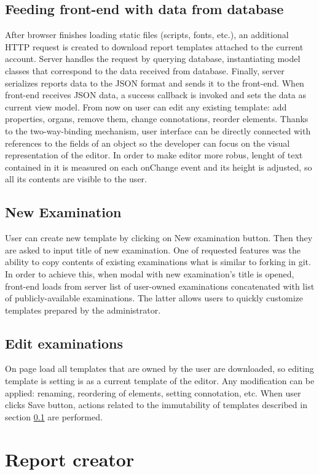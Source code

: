 \documentclass[12pt, twoside, openany]{report}
\theoremstyle{definition}
\begin{document}
\subsection{Feeding front-end with data from database}\label{templates-immutable}
After browser finishes loading static files (scripts, fonts, etc.), an additional HTTP request is created to download report templates attached to the current account. Server handles the request by querying database, instantiating model classes that correspond to the data received from database. Finally, server serializes reports data to the JSON format and sends it to the front-end. When front-end receives JSON data, a success callback is invoked and sets the data as current view model. 
From now on user can edit any existing template: add properties, organs, remove them, change connotations, reorder elements. Thanks to the two-way-binding mechanism, user interface can be directly connected with references to the fields of an object so the developer can focus on the visual representation of the editor. In order to make editor more robus, lenght of text contained in it is measured on each onChange event and its height is adjusted, so all its contents are visible to the user.
\subsection{New Examination}
User can create new template by clicking on New examination button. Then they are asked to input title of new examination. One of requested features was the ability to copy contents of existing examinations what is similar to forking in git. In order to achieve this, when modal with new examination's title is opened, front-end loads from server list of user-owned examinations concatenated with list of publicly-available examinations. The latter allows users to quickly customize templates prepared by the administrator.

\subsection{Edit examinations}
On page load all templates that are owned by the user are downloaded, so editing template is setting is as a current template of the editor. Any modification can be applied: renaming, reordering of elements, setting connotation, etc. When user clicks Save button, actions related to the immutability of templates described in section \ref{templates-immutable} are performed.


\section{Report creator}
\end{document}
